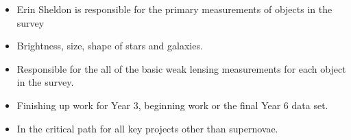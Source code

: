 \documentclass[aspectratio=169]{beamer}
\begin{document}
{\begin{columns}
        \begin{column}{0.5\textwidth}
            \begin{itemize}

                \item Erin Sheldon is responsible for the primary measurements
                    of objects in the survey

                \item Brightness, size, shape of stars and galaxies.

                \item Responsible for the all of the basic weak lensing measurements
                    for each object in the survey.

                \item Finishing up work for Year 3, beginning work or the final Year 6 data set.

                \item In the critical path for all key projects other than supernovae.

            \end{itemize}

        \end{column}

    \end{columns}


}
\end{document}
